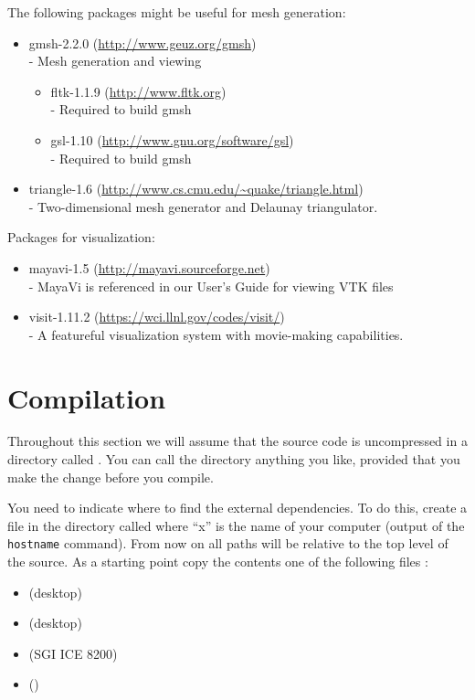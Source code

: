 The following packages might be useful for mesh generation:
\begin{itemize}
 \item gmsh-2.2.0 (\url{http://www.geuz.org/gmsh}) \\-
        Mesh generation and viewing
  \begin{itemize}
   \item fltk-1.1.9 (\url{http://www.fltk.org}) \\-
        Required to build gmsh 
   \item gsl-1.10 (\url{http://www.gnu.org/software/gsl}) \\-
        Required to build gmsh 
  \end{itemize}
 \item triangle-1.6 (\url{http://www.cs.cmu.edu/~quake/triangle.html}) \\-
        Two-dimensional mesh generator and Delaunay triangulator.
\end{itemize}

Packages for visualization:
\begin{itemize}
 \item mayavi-1.5 (\url{http://mayavi.sourceforge.net}) \\-
        MayaVi is referenced in our User's Guide for viewing VTK files
 \item visit-1.11.2 (\url{https://wci.llnl.gov/codes/visit/}) \\-
        A featureful visualization system with movie-making capabilities.
\end{itemize}

\section{Compilation}\label{sec:compilesrc}
Throughout this section we will assume that the source code is uncompressed in a directory called .
You can call the directory anything you like, provided that you make the change before you compile.

You need to indicate where to find the external dependencies.
To do this, create a file in the  directory called  where ``x'' is the name of your computer (output of the \texttt{hostname} command).
From now on all paths will be relative to the top level of the source.
As a starting point copy the contents one of the following files :
\begin{itemize}
 \item {} (\linux desktop)
\item {} (\macosx desktop)
\item {} (SGI ICE 8200)
\item {} (\winxp)
\end{itemize}

